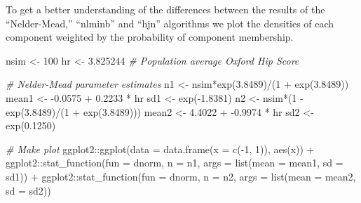 \documentclass[
]{article}
\newenvironment{Shaded}{\begin{snugshade}}{\end{snugshade}}
\newcommand{\AttributeTok}[1]{\textcolor[rgb]{0.77,0.63,0.00}{#1}}
\newcommand{\CommentTok}[1]{\textcolor[rgb]{0.56,0.35,0.01}{\textit{#1}}}
\newcommand{\DecValTok}[1]{\textcolor[rgb]{0.00,0.00,0.81}{#1}}
\newcommand{\FloatTok}[1]{\textcolor[rgb]{0.00,0.00,0.81}{#1}}
\newcommand{\FunctionTok}[1]{\textcolor[rgb]{0.00,0.00,0.00}{#1}}
\newcommand{\NormalTok}[1]{#1}
\newcommand{\OtherTok}[1]{\textcolor[rgb]{0.56,0.35,0.01}{#1}}
\newcommand{\SpecialCharTok}[1]{\textcolor[rgb]{0.00,0.00,0.00}{#1}}
\begin{document}
To get a better understanding of the differences between the results of the ``Nelder-Mead,'' ``nlminb'' and ``hjn'' algorithms we plot the densities of each component weighted by the probability of component membership.

\begin{Shaded}
\begin{Highlighting}[]
\NormalTok{nsim }\OtherTok{\textless{}{-}} \DecValTok{100}
\NormalTok{hr }\OtherTok{\textless{}{-}} \FloatTok{3.825244} \CommentTok{\# Population average Oxford Hip Score}

\CommentTok{\# Nelder{-}Mead parameter estimates}
\NormalTok{n1    }\OtherTok{\textless{}{-}}\NormalTok{ nsim}\SpecialCharTok{*}\FunctionTok{exp}\NormalTok{(}\FloatTok{3.8489}\NormalTok{)}\SpecialCharTok{/}\NormalTok{(}\DecValTok{1} \SpecialCharTok{+} \FunctionTok{exp}\NormalTok{(}\FloatTok{3.8489}\NormalTok{))}
\NormalTok{mean1 }\OtherTok{\textless{}{-}} \SpecialCharTok{{-}}\FloatTok{0.0575} \SpecialCharTok{+} \FloatTok{0.2233} \SpecialCharTok{*}\NormalTok{ hr}
\NormalTok{sd1   }\OtherTok{\textless{}{-}} \FunctionTok{exp}\NormalTok{(}\SpecialCharTok{{-}}\FloatTok{1.8381}\NormalTok{)}
\NormalTok{n2    }\OtherTok{\textless{}{-}}\NormalTok{ nsim}\SpecialCharTok{*}\NormalTok{(}\DecValTok{1} \SpecialCharTok{{-}} \FunctionTok{exp}\NormalTok{(}\FloatTok{3.8489}\NormalTok{)}\SpecialCharTok{/}\NormalTok{(}\DecValTok{1} \SpecialCharTok{+} \FunctionTok{exp}\NormalTok{(}\FloatTok{3.8489}\NormalTok{)))}
\NormalTok{mean2 }\OtherTok{\textless{}{-}} \FloatTok{4.4022} \SpecialCharTok{+} \SpecialCharTok{{-}}\FloatTok{0.9974} \SpecialCharTok{*}\NormalTok{ hr}
\NormalTok{sd2   }\OtherTok{\textless{}{-}} \FunctionTok{exp}\NormalTok{(}\FloatTok{0.1250}\NormalTok{)}

\CommentTok{\# Make plot}
\NormalTok{ggplot2}\SpecialCharTok{::}\FunctionTok{ggplot}\NormalTok{(}\AttributeTok{data =} \FunctionTok{data.frame}\NormalTok{(}\AttributeTok{x =} \FunctionTok{c}\NormalTok{(}\SpecialCharTok{{-}}\DecValTok{1}\NormalTok{, }\DecValTok{1}\NormalTok{)), }\FunctionTok{aes}\NormalTok{(x)) }\SpecialCharTok{+}
\NormalTok{  ggplot2}\SpecialCharTok{::}\FunctionTok{stat\_function}\NormalTok{(}\AttributeTok{fun =}\NormalTok{ dnorm, }
                         \AttributeTok{n =}\NormalTok{ n1, }
                         \AttributeTok{args =} \FunctionTok{list}\NormalTok{(}\AttributeTok{mean =}\NormalTok{ mean1, }\AttributeTok{sd =}\NormalTok{ sd1)) }\SpecialCharTok{+}
\NormalTok{  ggplot2}\SpecialCharTok{::}\FunctionTok{stat\_function}\NormalTok{(}\AttributeTok{fun =}\NormalTok{ dnorm, }
                         \AttributeTok{n =}\NormalTok{ n2, }
                         \AttributeTok{args =} \FunctionTok{list}\NormalTok{(}\AttributeTok{mean =}\NormalTok{ mean2, }\AttributeTok{sd =}\NormalTok{ sd2))}
\end{Highlighting}
\end{Shaded}
\end{document}
